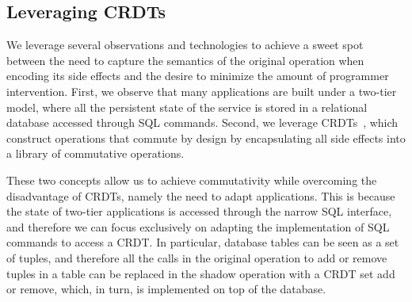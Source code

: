 \subsection{Leveraging CRDTs}

We leverage several observations
and technologies to achieve a sweet spot between the need to capture the
semantics of the original operation when encoding its side effects and
the desire to minimize the amount of programmer intervention.
First, we observe that many applications are
built under a two-tier model, where all the persistent state of the
service is stored in a relational database accessed through SQL commands.
Second, we leverage CRDTs~\cite{Preguica2009CRDT}, which
construct operations that commute by design by encapsulating all side
effects into a library of commutative operations.

These two concepts allow us to achieve commutativity while overcoming
the disadvantage of CRDTs, namely the need to adapt applications.
This is because the state of two-tier applications is
accessed through the narrow SQL interface, and therefore we can focus
exclusively on adapting the implementation of SQL commands to access a
CRDT. In particular, database tables can be seen as a set of tuples, and
therefore all the calls in the original operation to add or remove
tuples in a table can be replaced in the shadow operation with a CRDT set
add or remove, which, in turn, is implemented on top of the
database. 


